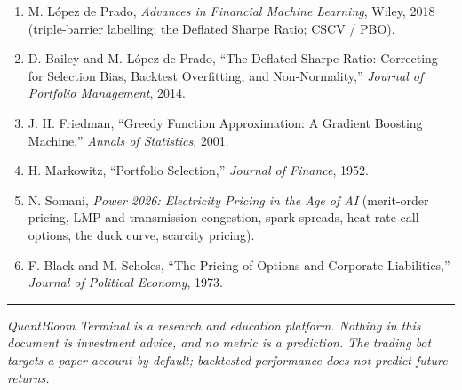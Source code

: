 \documentclass[
  11pt,
]{article}
\providecommand{\tightlist}{%
  \setlength{\itemsep}{0pt}\setlength{\parskip}{0pt}}
\begin{document}
\begin{enumerate}
\def\labelenumi{\arabic{enumi}.}
\tightlist
\item
  M. López de Prado, \emph{Advances in Financial Machine Learning},
  Wiley, 2018 (triple-barrier labelling; the Deflated Sharpe Ratio; CSCV
  / PBO).
\item
  D. Bailey and M. López de Prado, ``The Deflated Sharpe Ratio:
  Correcting for Selection Bias, Backtest Overfitting, and
  Non-Normality,'' \emph{Journal of Portfolio Management}, 2014.
\item
  J. H. Friedman, ``Greedy Function Approximation: A Gradient Boosting
  Machine,'' \emph{Annals of Statistics}, 2001.
\item
  H. Markowitz, ``Portfolio Selection,'' \emph{Journal of Finance},
  1952.
\item
  N. Somani, \emph{Power 2026: Electricity Pricing in the Age of AI}
  (merit-order pricing, LMP and transmission congestion, spark spreads,
  heat-rate call options, the duck curve, scarcity pricing).
\item
  F. Black and M. Scholes, ``The Pricing of Options and Corporate
  Liabilities,'' \emph{Journal of Political Economy}, 1973.
\end{enumerate}

\begin{center}\rule{0.5\linewidth}{0.5pt}\end{center}

\emph{QuantBloom Terminal is a research and education platform. Nothing
in this document is investment advice, and no metric is a prediction.
The trading bot targets a paper account by default; backtested
performance does not predict future returns.}
\end{document}
